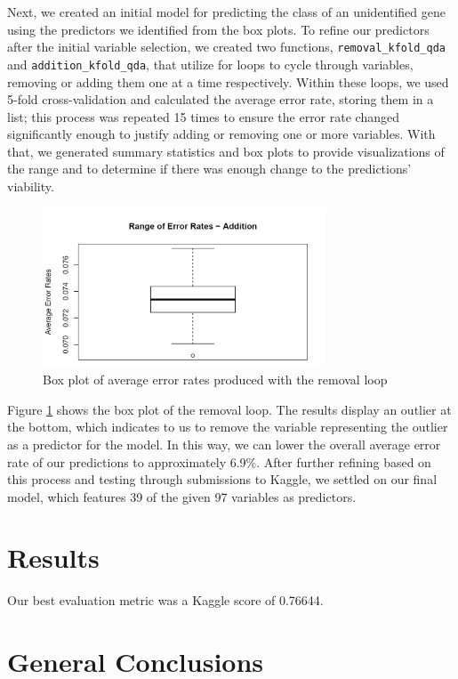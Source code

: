 \documentclass{scrartcl}
\begin{document}
Next, we created an initial model for predicting the class of an unidentified gene using the predictors we identified from the box plots. To refine our predictors after the initial variable selection, we created two functions, \verb|removal_kfold_qda| and \verb|addition_kfold_qda|, that utilize for loops to cycle through variables, removing or adding them one at a time respectively. Within these loops, we used 5-fold cross-validation and calculated the average error rate, storing them in a list; this process was repeated 15 times to ensure the error rate changed significantly enough to justify adding or removing one or more variables. With that, we generated summary statistics and box plots to provide visualizations of the range and to determine if there was enough change to the predictions' viability.

\begin{figure}
    \centering
    \includegraphics[width=0.75\textwidth]{removal.png}
    \caption{Box plot of average error rates produced with the removal loop}
    \label{fig:removal}
\end{figure}

Figure \ref{fig:removal} shows the box plot of the removal loop. The results display an outlier at the bottom, which indicates to us to remove the variable representing the outlier as a predictor for the model. In this way, we can lower the overall average error rate of our predictions to approximately 6.9\%. After further refining based on this process and testing through submissions to Kaggle, we settled on our final model, which features 39 of the given 97 variables as predictors.

\section{Results}

Our best evaluation metric was a Kaggle score of 0.76644.

\section{General Conclusions}
\end{document}
